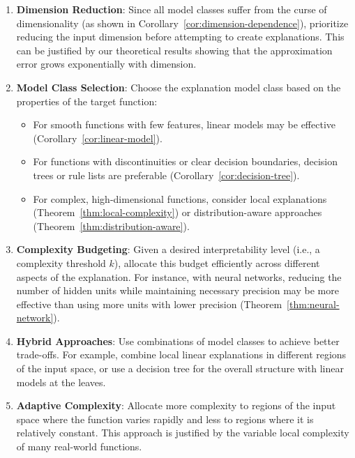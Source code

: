 \documentclass[11pt,letter,leqno]{article}
\begin{document}
\begin{enumerate}
\item \textbf{Dimension Reduction}: Since all model classes suffer from the curse of dimensionality (as shown in Corollary~\ref{cor:dimension-dependence}), prioritize reducing the input dimension before attempting to create explanations.  This can be justified by our theoretical results showing that the approximation error grows exponentially with dimension.

\item \textbf{Model Class Selection}: Choose the explanation model class based on the properties of the target function:
   \begin{itemize}
      \item For smooth functions with few features, linear models may be effective (Corollary~\ref{cor:linear-model}).
      \item For functions with discontinuities or clear decision boundaries, decision trees or rule lists are preferable (Corollary~\ref{cor:decision-tree}).
      \item For complex, high-dimensional functions, consider local explanations (Theorem~\ref{thm:local-complexity}) or distribution-aware approaches (Theorem~\ref{thm:distribution-aware}).
   \end{itemize}

\item \textbf{Complexity Budgeting}: Given a desired interpretability level (i.e., a complexity threshold $k$), allocate this budget efficiently across different aspects of the explanation.  For instance, with neural networks, reducing the number of hidden units while maintaining necessary precision may be more effective than using more units with lower precision (Theorem~\ref{thm:neural-network}).

\item \textbf{Hybrid Approaches}: Use combinations of model classes to achieve better trade-offs.  For example, combine local linear explanations in different regions of the input space, or use a decision tree for the overall structure with linear models at the leaves.

\item \textbf{Adaptive Complexity}: Allocate more complexity to regions of the input space where the function varies rapidly and less to regions where it is relatively constant.  This approach is justified by the variable local complexity of many real-world functions.
\end{enumerate}
\end{document}
